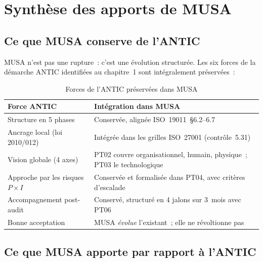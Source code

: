\documentclass[12pt,a4paper,oneside]{report}
\begin{document}
\section{Synth\`ese des apports de MUSA}
\label{sec:synthese_apports}

\subsection{Ce que MUSA conserve de l'ANTIC}

MUSA n'est pas une rupture~: c'est une \'evolution structur\'ee. Les six forces
de la d\'emarche ANTIC identifi\'ees au chapitre~1 sont int\'egralement pr\'eserv\'ees~:

\begin{table}[H]
\centering\small
\caption{Forces de l'ANTIC pr\'eserv\'ees dans MUSA}
\label{tab:conserve}
\begin{tabularx}{\textwidth}{p{4.5cm}X}
\toprule
\rowcolor{theadcolor}
\color{white}\textbf{Force ANTIC} &
\color{white}\textbf{Int\'egration dans MUSA} \\
\midrule
Structure en 5 phases & Conserv\'ee, align\'ee ISO~19011~§6.2--6.7 \\
Ancrage local (loi 2010/012) & Int\'egr\'ee dans les grilles ISO~27001 (contr\^ole~5.31) \\
Vision globale (4 axes) & PT02 couvre organisationnel, humain, physique~; PT03 le technologique \\
Approche par les risques $P \times I$ & Conserv\'ee et formalis\'ee dans PT04, avec crit\`eres d'escalade \\
Accompagnement post-audit & Conserv\'e, structur\'e en 4 jalons sur 3~mois avec PT06 \\
Bonne acceptation & MUSA \textit{\'evolue} l'existant~; elle ne r\'evoltionne pas \\
\bottomrule
\end{tabularx}
\end{table}

\subsection{Ce que MUSA apporte par rapport \`a l'ANTIC}
\end{document}
